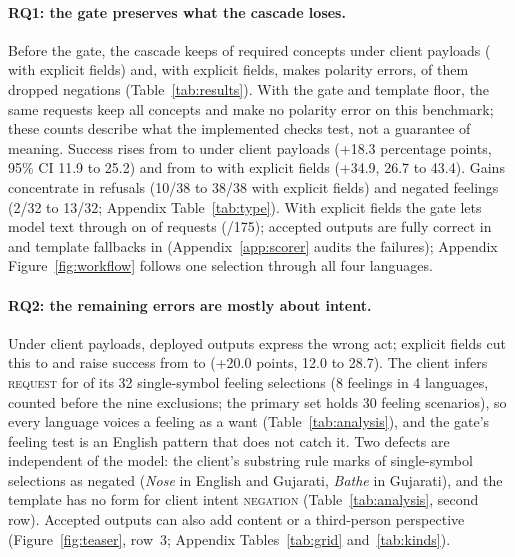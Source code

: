 \paragraph{RQ1: the gate preserves what the cascade loses.}
Before the gate, the cascade keeps \XPreUKeptPct{} of required concepts under client payloads (\XPreSKeptPct{} with explicit fields) and, with explicit fields, makes \XPreSPol{} polarity errors, \XPolDropPreS{} of them dropped negations (Table~\ref{tab:results}).
With the gate and template floor, the same requests keep all \NConc{} concepts and make no polarity error on this benchmark; these counts describe what the implemented checks test, not a guarantee of meaning.
Success rises from \XPreUSucc{} to \XDepUSucc{} under client payloads (+18.3 percentage points, 95\% CI 11.9 to 25.2) and from \XPreSSucc{} to \XDepSSucc{} with explicit fields (+34.9, 26.7 to 43.4).
Gains concentrate in refusals (10/38 to 38/38 with explicit fields) and negated feelings (2/32 to 13/32; Appendix Table~\ref{tab:type}).
With explicit fields the gate lets model text through on \XGateAccPctS{} of requests (\XGateAccS{}/175); accepted outputs are fully correct in \XGateOkS{} and template fallbacks in \XFbOkS{} (Appendix~\ref{app:scorer} audits the failures); Appendix Figure~\ref{fig:workflow} follows one selection through all four languages.

\paragraph{RQ2: the remaining errors are mostly about intent.}
Under client payloads, \XDepUWrong{} deployed outputs express the wrong act; explicit fields cut this to \XDepSWrong{} and raise success from \XDepUSuccPct{} to \XDepSSuccPct{} (+20.0 points, 12.0 to 28.7).
The client infers \textsc{request} for \UIFeelReq{} of its 32 single-symbol feeling selections (8 feelings in 4 languages, counted before the nine exclusions; the primary set holds 30 feeling scenarios), so every language voices a feeling as a want (Table~\ref{tab:analysis}), and the gate's feeling test is an English pattern that does not catch it.
Two defects are independent of the model: the client's substring rule marks \UIFalseNeg{} of \UISingle{} single-symbol selections as negated (\emph{Nose} in English and Gujarati, \emph{Bathe} in Gujarati), and the template has no form for client intent \textsc{negation} (Table~\ref{tab:analysis}, second row).
Accepted outputs can also add content or a third-person perspective (Figure~\ref{fig:teaser}, row~3; Appendix Tables~\ref{tab:grid} and~\ref{tab:kinds}).

